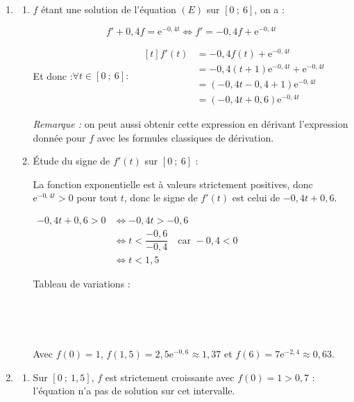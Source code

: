 \documentclass[10pt]{article}
\providecommand{\e}{{\mathrm{e}}}
\providecommand{\np}[2][]{{#2~#1}}
\begin{document}
\begin{enumerate}
\item
	\begin{enumerate}
		\item $f$ étant une solution de l'équation $(E)$ sur $[0~;~6]$, on a :

\[f' + 0,4f = \e^{-0,4t} \iff f' = -0,4f + \e^{-0,4t}\]

Et donc :\quad $\forall t \in [0~;~6] :\quad \begin{aligned}[t]
f'(t) &= -0,4f(t) + \e^{-0,4t}\\
	&= - 0,4(t+ 1)\e^{-0,4t} + \e^{-0,4t}\\
	&= (- 0,4t - 0,4 + 1)\e^{-0,4t}\\
	&= (-0,4t + 0,6)\e^{-0,4t}
\end{aligned}$

\emph{Remarque :} on peut aussi obtenir cette expression en dérivant l'expression donnée pour $f$ avec les formules classiques de dérivation.

\item Étude du signe de $f'(t)$ sur $[0~;~6]$ :

La fonction exponentielle est à valeurs strictement positives, donc $\e^{-0,4t} > 0$ pour tout $t$, donc le signe de $f'(t)$ est celui de $-0,4t + 0,6$.

$\begin{aligned}
-0,4t + 0,6 > 0 &\iff -0,4 t > -0,6\\
	&\iff t < \dfrac{-0,6}{-0,4 }\quad \text{car }-0,4 <0\\
	&\iff t < 1,5
\end{aligned}$

Tableau de variations :

\hfill~\hfill~

Avec $f(0) = 1$,\: $f(1,5) = 2,5\e^{-0,6} \approx 1,37$ et $f(6) = 7\e^{-2,4} \approx 0,63$.
\end{enumerate}

\item
	\begin{enumerate}
		\item Sur $[0~;~1,5]$, $f$ est strictement croissante avec $f(0) = 1 > 0,7$ : l'équation n'a pas de solution sur cet intervalle.


\end{enumerate}
\end{enumerate}
\end{document}
